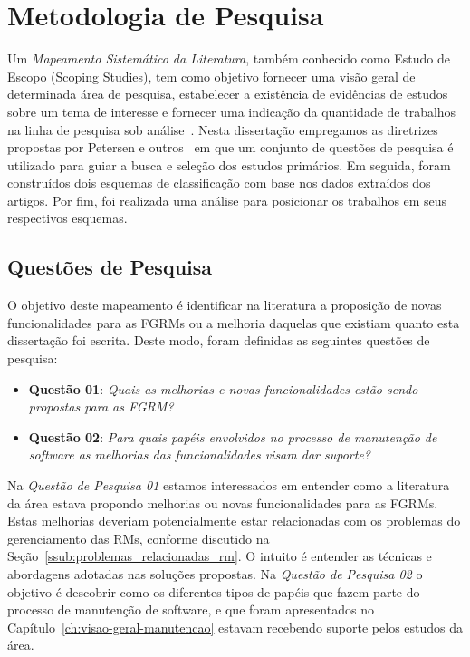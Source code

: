 \section{Metodologia de Pesquisa}\label{sec:map-metodologia}

Um \textit{Mapeamento Sistemático da Literatura}, também conhecido como Estudo
de Escopo (Scoping Studies), tem como objetivo fornecer uma visão geral de
determinada área de pesquisa, estabelecer a existência de evidências de estudos
sobre um tema de interesse e fornecer uma indicação da quantidade de trabalhos
na linha de pesquisa sob
análise~\cite{keele2007guidelines,wohlin2012experimentation}. Nesta dissertação
empregamos as diretrizes propostas por Petersen e outros~\cite{Petersen2008} em
que um conjunto de questões de pesquisa é utilizado para guiar a busca e
seleção dos estudos primários. Em seguida, foram construídos dois esquemas de
classificação com base nos dados extraídos dos artigos. Por fim, foi realizada
uma análise para posicionar os trabalhos em seus respectivos esquemas.


\subsection{Questões de Pesquisa}\label{subsec:map-questoes-de-pesquisa}

O objetivo deste mapeamento é identificar na literatura a proposição de novas
funcionalidades para as FGRMs ou a melhoria daquelas que existiam quanto esta
dissertação foi escrita. Deste modo, foram definidas as seguintes questões de
pesquisa:

\begin{itemize}
	\item \textbf{Questão 01}: \textit{Quais as melhorias e novas
			funcionalidades estão sendo propostas para as FGRM?}
    \item \textbf{Questão 02}: \textit{Para quais papéis envolvidos no processo
            de manutenção de software as melhorias das funcionalidades visam
            dar suporte?}
\end{itemize}

Na \textit{Questão de Pesquisa 01} estamos interessados em entender como a
literatura da área estava propondo melhorias ou novas funcionalidades para as
FGRMs. Estas melhorias deveriam potencialmente estar relacionadas com os
problemas do gerenciamento das RMs, conforme discutido na
Seção~\ref{ssub:problemas_relacionadas_rm}. O intuito é entender as técnicas e
abordagens adotadas nas soluções propostas. Na \textit{Questão de Pesquisa 02}
o objetivo é descobrir como os diferentes tipos de papéis que fazem parte do
processo de manutenção de software, e que foram apresentados no
Capítulo~\ref{ch:visao-geral-manutencao} estavam recebendo suporte pelos
estudos da área.

